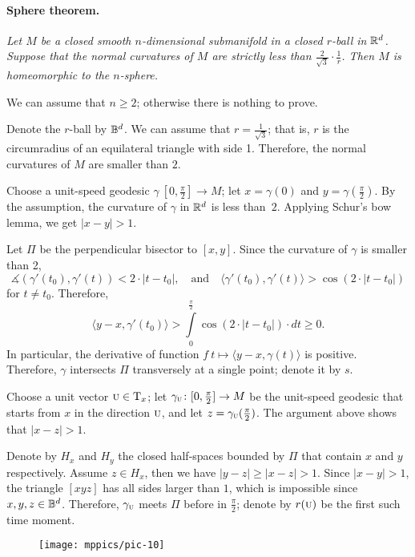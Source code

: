 \documentclass[a4paper,10pt]{article}
\begin{document}
\paragraph{Sphere theorem.}
\label{thm:strict}
\textit{Let $M$ be a closed smooth $n$-dimensional submanifold in a closed $r$-ball in $\mathbb{R}^d$.
Suppose that the normal curvatures of $M$ are strictly less than $\tfrac2{\sqrt{3}}\cdot\tfrac1r$.
Then $M$ is homeomorphic to the $n$-sphere.}


We can assume that $n\ge 2$;
otherwise there is nothing to prove.

Denote the $r$-ball by $\mathbb{B}^d$.
We can assume that $r=\tfrac1{\sqrt{3}}$; that is, $r$ is the circumradius of an equilateral triangle with side 1.
Therefore, the normal curvatures of $M$ are smaller than $2$.

Choose a unit-speed geodesic $\gamma\:[0,\tfrac\pi2]\to M$;
let $x=\gamma(0)$ and $y=\gamma(\tfrac\pi2)$.
By the assumption, the curvature of $\gamma$ in $\mathbb{R}^d$ is less than~$2$.
Applying Schur's bow lemma, we get $|x-y|>1$.

Let $\Pi$ be the perpendicular bisector to $[x,y]$.
Since the curvature of $\gamma$ is smaller than 2,
\[\measuredangle(\gamma'(t_0),\gamma'(t))< 2\cdot|t-t_0|,
\quad\text{and}\quad
\langle \gamma'(t_0),\gamma'(t) \rangle> \cos (2\cdot|t-t_0|)\] for $t\ne t_0$.
Therefore,
\[\langle y-x,\gamma'(t_0) \rangle>\int\limits_0^{\frac\pi2}\cos (2\cdot |t-t_0|)\cdot dt\ge0.\]
In particular, the derivative of function 
$f\:t\mapsto \langle y-x,\gamma(t) \rangle$
is positive.
Therefore, $\gamma$ intersects $\Pi$ transversely at a single point;
denote it by $s$.



Choose a unit vector ${\normalfont\textsc{u}}\in\mathrm{T}_x$;
let $\gamma_{{\normalfont\textsc{u}}}\colon[0,\tfrac\pi2]\to M$ be the unit-speed geodesic that starts from $x$ in the direction ${{\normalfont\textsc{u}}}$, and let $z=\gamma_{{\normalfont\textsc{u}}}(\tfrac\pi2)$.
The argument above shows that $|x-z|>1$.

Denote by $H_x$ and $H_y$ the closed half-spaces bounded by $\Pi$ that contain $x$ and $y$ respectively.
Assume $z\in H_x$, then we have $|y-z|\ge |x-z|>1$.
Since $|x-y|>1$, the triangle $[xyz]$ has all sides larger than $1$,
which is impossible since $x,y,z\in \mathbb{B}^d$.
Therefore, $\gamma_{{\normalfont\textsc{u}}}$ meets $\Pi$ before in $\tfrac\pi2$;
denote by $r({{\normalfont\textsc{u}}})$ be the first such time moment.

\begin{wrapfigure}{r}{36 mm}
\vskip-4mm
\centering
\texttt{[image: mppics/pic-10]}
\vskip0mm
\end{wrapfigure}
\end{document}
